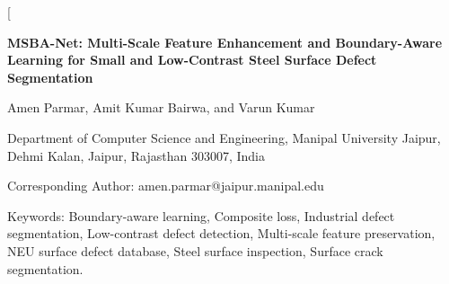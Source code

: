 \documentclass[10pt,a4paper]{article}
\newif\ifblind
\begin{document}
\twocolumn[{
  \begin{center}
    {\fontsize{15pt}{17pt}\bfseries MSBA-Net: Multi-Scale Feature Enhancement and Boundary-Aware Learning for Small and Low-Contrast Steel Surface Defect Segmentation \par}
    \vspace{14pt}
    \ifblind
      {\fontsize{10pt}{12pt}\selectfont Anonymous Author(s) \par}
      \vspace{3pt}
      {\fontsize{10pt}{12pt}\selectfont Institutional Affiliations and Contact Details Withheld for Double-Blind Review \par}
    \else
      {\fontsize{10pt}{12pt}\selectfont Amen Parmar, Amit Kumar Bairwa, and Varun Kumar \par}
      \vspace{3pt}
      {\fontsize{10pt}{12pt}\selectfont Department of Computer Science and Engineering, Manipal University Jaipur, Dehmi Kalan, Jaipur, Rajasthan 303007, India \par}
      {\fontsize{9pt}{11pt}\selectfont Corresponding Author: amen.parmar@jaipur.manipal.edu \par}
    \fi
    \vspace{14pt}
  \end{center}

  \noindent
  \hangindent=2.0cm
  {\fontsize{9pt}{11pt}\selectfont
  Keywords: Boundary-aware learning, Composite loss, Industrial defect segmentation, Low-contrast defect detection, Multi-scale feature preservation, NEU surface defect database, Steel surface inspection, Surface crack segmentation.
  \par}
  \vspace{8pt}

}
\end{document}
